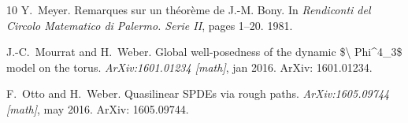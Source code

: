 \documentclass{amsart}
\newcommand{\tmtextit}[1]{{\itshape{#1}}}
\theoremstyle{remark}
\theoremstyle{definition}
\begin{document}
\begin{thebibliography}{10}
  Y.~Meyer.{\newblock} Remarques sur un
  th{\'e}or{\`e}me de J.-M. Bony.{\newblock} In \tmtextit{Rendiconti del
  Circolo Matematico di Palermo. Serie II},  pages  1--20. 1981.{\newblock}
  
  J.-C.~Mourrat  and  H.~Weber.{\newblock}
  Global well-posedness of the dynamic \$\textbackslash
  Phi{\textasciicircum}4\_3\$ model on the torus.{\newblock}
  \tmtextit{ArXiv:1601.01234 [math]}, jan 2016.{\newblock} ArXiv:
  1601.01234.{\newblock}
  
  F.~Otto  and  H.~Weber.{\newblock}
  Quasilinear SPDEs via rough paths.{\newblock} \tmtextit{ArXiv:1605.09744
  [math]}, may 2016.{\newblock} ArXiv: 1605.09744.{\newblock}
\end{thebibliography}
\end{document}
